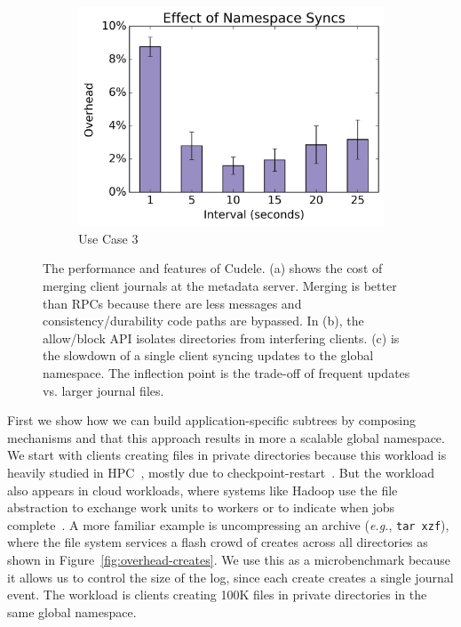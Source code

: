 \begin{figure}[t]
\begin{subfigure}[b]{.3\linewidth}
      \includegraphics[width=1.0\linewidth]{graphs/slowdown-sync.png}
      \caption{Use Case 3}
      \label{fig:slowdown-sync}
  \end{subfigure}
\caption{The performance and features of Cudele. (a) shows the cost of
merging client journals at the metadata server. Merging is better than RPCs
because there are less messages and consistency/durability code paths are
bypassed. In (b), the allow/block API isolates directories from interfering
clients. (c) is the slowdown of a single client syncing updates to the global
namespace. The inflection point is the trade-off of frequent updates vs. larger
journal files.\label{fig:use-cases}}
\end{figure}

First we show how we can build application-specific subtrees by composing
mechanisms and that this approach results in more a scalable global
namespace. We start with clients creating files in private directories because
this workload is heavily studied in HPC~\cite{weil:sc2004-dyn-metadata,
ren:sc2014-indexfs, patil:fast2011-giga, zheng:pdsw2014-batchfs,
sevilla:sc15-mantle}, mostly due to checkpoint-restart~\cite{bent_plfs_2009}.
But the workload also appears in cloud workloads, where systems like Hadoop use
the file abstraction to exchange work units to workers or to indicate when jobs
complete~\cite{shvachko:login2012-hdfs-scalability}. A more familiar example is
uncompressing an archive ({\it e.g.}, \texttt{tar xzf}), where the file system
services a flash crowd of creates across all directories as shown in
Figure~\ref{fig:overhead-creates}.  We use this as a microbenchmark because it
allows us to control the size of the log, since each create creates a single
journal event. The workload is clients creating 100K files in private
directories in the same global namespace.

